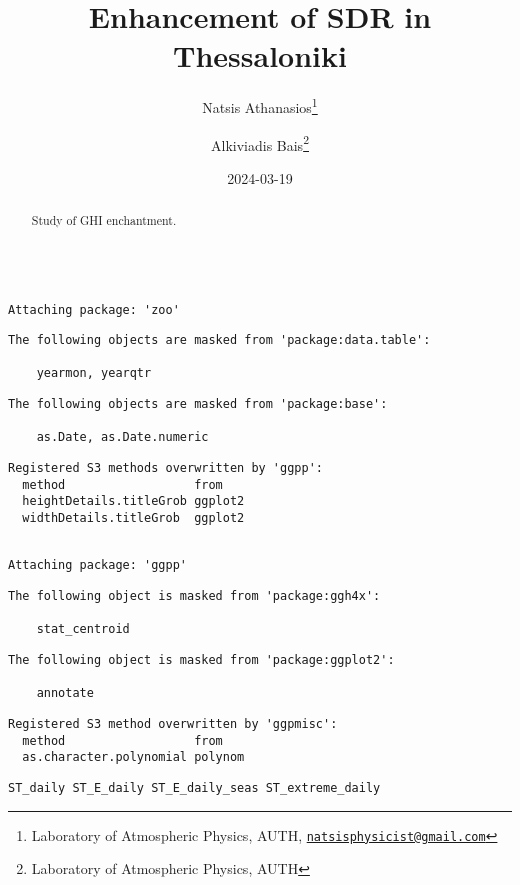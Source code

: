 \documentclass[
  10pt,
  a4paper,oneside]{article}
\title{Enhancement of SDR in Thessaloniki}
\author{Natsis Athanasios\footnote{Laboratory of Atmospheric Physics, AUTH, \href{mailto:natsisphysicist@gmail.com}{\nolinkurl{natsisphysicist@gmail.com}}} \and Alkiviadis Bais\footnote{Laboratory of Atmospheric Physics, AUTH}}
\date{2024-03-19}
\begin{document}
\maketitle
\begin{abstract}
Study of GHI enchantment.
\end{abstract}

{
\hypersetup{linkcolor=}
\setcounter{tocdepth}{4}
\tableofcontents
}
\begin{verbatim}

Attaching package: 'zoo'
\end{verbatim}

\begin{verbatim}
The following objects are masked from 'package:data.table':

    yearmon, yearqtr
\end{verbatim}

\begin{verbatim}
The following objects are masked from 'package:base':

    as.Date, as.Date.numeric
\end{verbatim}

\begin{verbatim}
Registered S3 methods overwritten by 'ggpp':
  method                  from   
  heightDetails.titleGrob ggplot2
  widthDetails.titleGrob  ggplot2
\end{verbatim}

\begin{verbatim}

Attaching package: 'ggpp'
\end{verbatim}

\begin{verbatim}
The following object is masked from 'package:ggh4x':

    stat_centroid
\end{verbatim}

\begin{verbatim}
The following object is masked from 'package:ggplot2':

    annotate
\end{verbatim}

\begin{verbatim}
Registered S3 method overwritten by 'ggpmisc':
  method                  from   
  as.character.polynomial polynom
\end{verbatim}

\begin{verbatim}
ST_daily ST_E_daily ST_E_daily_seas ST_extreme_daily
\end{verbatim}
\end{document}
